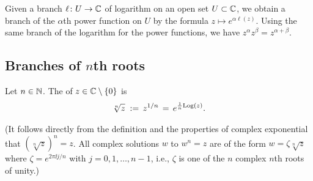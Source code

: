 Given a branch $\ell \colon U \to \mathbb{C}$ of logarithm on an
open set $U \subset \mathbb{C}$, we obtain a branch of the $\alpha$th power
function on $U$ by the formula $z \mapsto e^{\alpha \ell(z)}$.
Using the same branch of the logarithm for the
power functions, we have $z^\alpha z^\beta = z^{\alpha + \beta}$.

\subsection{Branches of $n$th roots}

\begin{definition}
  \label{def:principal_complex_nth_root}
  Let $n \in \mathbb{N}$. The  of $z \in \mathbb{C} \setminus \left\{ 0 \right\}$ is
  \begin{align*}
    \sqrt[n]{z} \; :=  \, z^{1/n} \, = \, e^{\frac{1}{n} \mathrm{Log}(z)} .
  \end{align*}

  (It follows directly from the definition and
  the properties of complex exponential that
  $(\sqrt[n]{z})^n = z$.
  All complex solutions $w$ to $w^n = z$ are of the
  form $w = \zeta \sqrt[n]{z}$ where $\zeta = e^{2 \pi \ii j / n}$
  with $j = 0, 1, \ldots, n-1$, i.e., $\zeta$ is one of the
  $n$ complex $n$th roots of unity.)
\end{definition}
